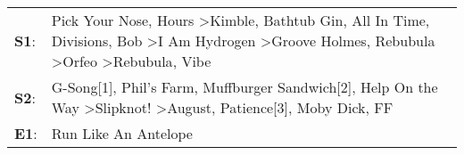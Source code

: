 \begin{supertabular}{p{0.03\textwidth}p{0.92\textwidth}}
 \textbf{S1}:  &  Pick Your Nose\textsuperscript{}, \enspace Hours\textsuperscript{} \textgreater \enspace Kimble\textsuperscript{}, \enspace Bathtub Gin\textsuperscript{}, \enspace All In Time\textsuperscript{}, \enspace Divisions\textsuperscript{}, \enspace Bob\textsuperscript{} \textgreater \enspace I Am Hydrogen\textsuperscript{} \textgreater \enspace Groove Holmes\textsuperscript{}, \enspace Rebubula\textsuperscript{} \textgreater \enspace Orfeo\textsuperscript{} \textgreater \enspace Rebubula\textsuperscript{}, \enspace Vibe\textsuperscript{}  \enspace  \\
 \textbf{S2}:  &                                                                                                                                                                          G-Song[1]\textsuperscript{}, \enspace Phil's Farm\textsuperscript{}, \enspace Muffburger Sandwich[2]\textsuperscript{}, \enspace Help On the Way\textsuperscript{} \textgreater \enspace Slipknot!\textsuperscript{} \textgreater \enspace August\textsuperscript{}, \enspace Patience[3]\textsuperscript{}, \enspace Moby Dick\textsuperscript{}, \enspace FF\textsuperscript{}  \enspace  \\
 \textbf{E1}:  &                                                                                                                                                                                                                                                                                                                                                                                                                                                                                                                    Run Like An Antelope\textsuperscript{}  \enspace  \\
\end{supertabular}
